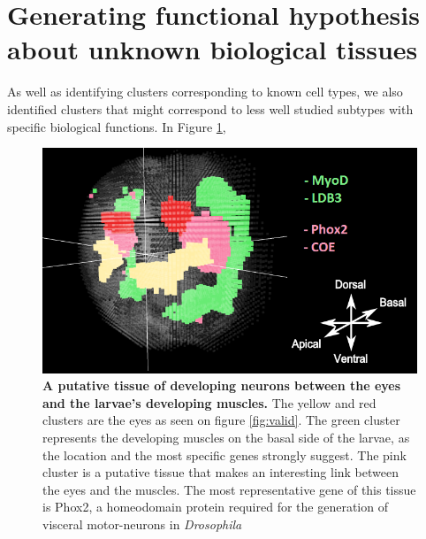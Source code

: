 	\section{Generating functional hypothesis about unknown biological tissues}
	As well as identifying clusters corresponding to known cell types, we also identified clusters that might correspond to less well studied subtypes with specific biological functions. In Figure \ref{fig:eyes_muscles}, 
	\begin{figure}[h]
\centerline{\includegraphics[width=0.8\linewidth]{gfx/chapter6/eyes_muscles.png}}
\caption{{\bf A putative tissue of developing neurons between the eyes and the larvae's developing muscles.} The yellow and red clusters are the eyes as seen on figure \ref{fig:valid}. The green cluster represents the developing muscles on the basal side of the larvae, as the location and the most specific genes strongly suggest. The pink cluster is a putative tissue that makes an interesting link between the eyes and the muscles. The most representative gene of this tissue is Phox2, a homeodomain protein required for the generation of visceral motor-neurons in \emph{Drosophila} \cite{briscoe99}}
\label{fig:eyes_muscles}
	\end{figure}


